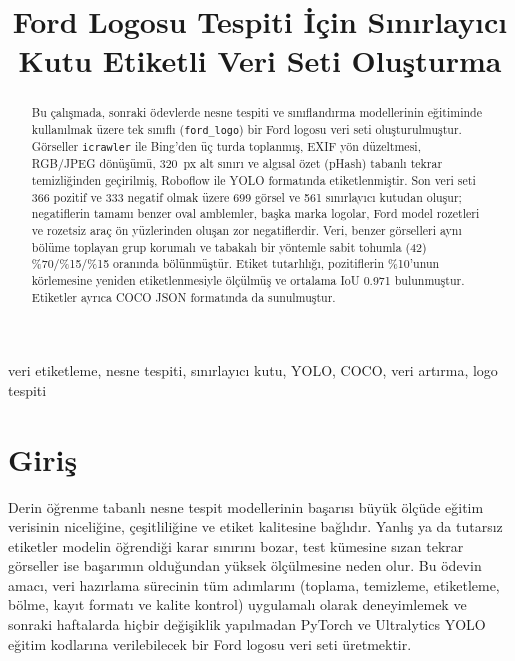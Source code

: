 \documentclass[conference]{IEEEtran}
\newcommand{\kod}[1]{\texttt{\small #1}}
\begin{document}
\title{Ford Logosu Tespiti İçin Sınırlayıcı Kutu Etiketli Veri Seti Oluşturma}

\author{
}

\maketitle

\begin{abstract}
Bu çalışmada, sonraki ödevlerde nesne tespiti ve sınıflandırma modellerinin eğitiminde
kullanılmak üzere tek sınıflı (\kod{ford\_logo}) bir Ford logosu veri seti oluşturulmuştur.
Görseller \kod{icrawler} ile Bing'den üç turda toplanmış, EXIF yön düzeltmesi, RGB/JPEG
dönüşümü, 320~px alt sınırı ve algısal özet (pHash) tabanlı tekrar temizliğinden geçirilmiş,
Roboflow ile YOLO formatında etiketlenmiştir. Son veri seti 366 pozitif ve 333 negatif olmak
üzere 699 görsel ve 561 sınırlayıcı kutudan oluşur; negatiflerin tamamı benzer oval amblemler,
başka marka logolar, Ford model rozetleri ve rozetsiz araç ön yüzlerinden oluşan zor
negatiflerdir. Veri, benzer görselleri aynı bölüme toplayan grup korumalı ve tabakalı bir
yöntemle sabit tohumla (42) \%70/\%15/\%15 oranında bölünmüştür. Etiket tutarlılığı,
pozitiflerin \%10'unun körlemesine yeniden etiketlenmesiyle ölçülmüş ve ortalama IoU 0.971
bulunmuştur. Etiketler ayrıca COCO JSON formatında da sunulmuştur.
\end{abstract}

\begin{IEEEkeywords}
veri etiketleme, nesne tespiti, sınırlayıcı kutu, YOLO, COCO, veri artırma, logo tespiti
\end{IEEEkeywords}

\section{Giriş}

Derin öğrenme tabanlı nesne tespit modellerinin başarısı büyük ölçüde eğitim verisinin
niceliğine, çeşitliliğine ve etiket kalitesine bağlıdır. Yanlış ya da tutarsız etiketler
modelin öğrendiği karar sınırını bozar, test kümesine sızan tekrar görseller ise başarımın
olduğundan yüksek ölçülmesine neden olur. Bu ödevin amacı, veri hazırlama sürecinin tüm
adımlarını (toplama, temizleme, etiketleme, bölme, kayıt formatı ve kalite kontrol) uygulamalı
olarak deneyimlemek ve sonraki haftalarda hiçbir değişiklik yapılmadan PyTorch ve Ultralytics
YOLO~\cite{yolov8} eğitim kodlarına verilebilecek bir Ford logosu veri seti üretmektir.
\end{document}
